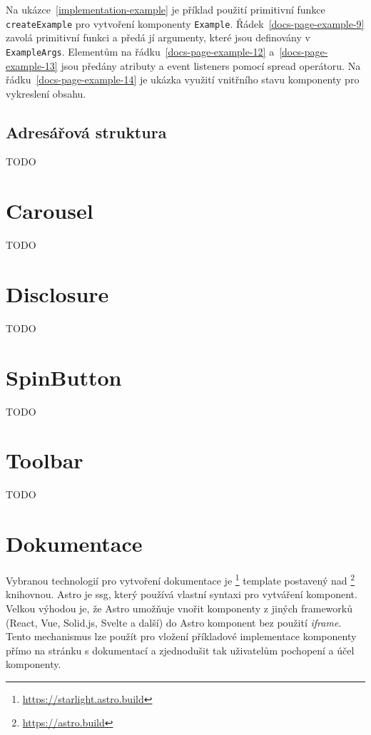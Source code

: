Na ukázce~\ref{implementation-example} je příklad použití primitivní funkce \texttt{createExample} pro vytvoření komponenty \texttt{Example}.
Řádek~\ref{docs-page-example-9} zavolá primitivní funkci a předá jí argumenty, které jsou definovány v \texttt{ExampleArgs}.
Elementům na řádku~\ref{docs-page-example-12} a~\ref{docs-page-example-13} jsou předány atributy a event listeners pomocí spread operátoru.
Na řádku~\ref{docs-page-example-14} je ukázka využití vnitřního stavu komponenty pro vykreslení obsahu.

\subsection{Adresářová struktura}

TODO

\section{Carousel}

TODO

\section{Disclosure}

TODO

\section{SpinButton}

TODO

\section{Toolbar}

TODO

\clearpage

\section{Dokumentace}


Vybranou technologií pro vytvoření dokumentace je \footnote{\url{https://starlight.astro.build}} template postavený nad \footnote{\url{https://astro.build}} knihovnou.
Astro je \gls{ssg}, který používá vlastní syntaxi pro vytváření komponent.
Velkou výhodou je, že Astro umožňuje vnořit komponenty z jiných frameworků (React, Vue, Solid.js, Svelte a další) do Astro komponent bez použití \textit{iframe}.
Tento mechanismus lze použít pro vložení příkladové implementace komponenty přímo na stránku s dokumentací a zjednodušit tak uživatelům pochopení a účel komponenty.

